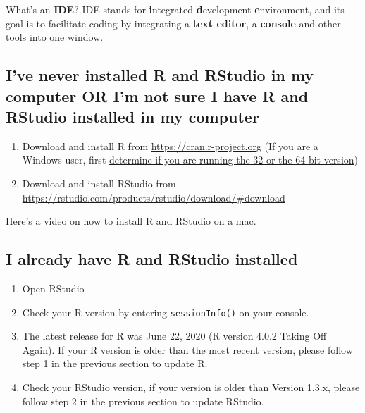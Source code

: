 \documentclass[
]{book}
\providecommand{\tightlist}{%
  \setlength{\itemsep}{0pt}\setlength{\parskip}{0pt}}
\begin{document}
What's an \textbf{IDE}? IDE stands for \textbf{i}ntegrated \textbf{d}evelopment \textbf{e}nvironment, and its goal is to facilitate coding by integrating a \textbf{text editor}, a \textbf{console} and other tools into one window.

\hypertarget{ive-never-installed-r-and-rstudio-in-my-computer-or-im-not-sure-i-have-r-and-rstudio-installed-in-my-computer}{%
\subsection{I've never installed R and RStudio in my computer OR I'm not sure I have R and RStudio installed in my computer}\label{ive-never-installed-r-and-rstudio-in-my-computer-or-im-not-sure-i-have-r-and-rstudio-installed-in-my-computer}}

\begin{enumerate}
\def\labelenumi{\arabic{enumi}.}
\tightlist
\item
  Download and install R from \url{https://cran.r-project.org} (If you are a Windows user, first \href{https://www.computerhope.com/issues/ch001121.htm\#:~:text=Press\%20and\%20hold\%20the\%20Windows,running\%20the\%2064\%2Dbit\%20version.}{determine if you are running the 32 or the 64 bit version})
\item
  Download and install RStudio from \url{https://rstudio.com/products/rstudio/download/\#download}
\end{enumerate}

Here's a \href{https://youtu.be/Iwp8bm7w4fQ}{video on how to install R and RStudio on a mac}.

\hypertarget{i-already-have-r-and-rstudio-installed}{%
\subsection{I already have R and RStudio installed}\label{i-already-have-r-and-rstudio-installed}}

\begin{enumerate}
\def\labelenumi{\arabic{enumi}.}
\tightlist
\item
  Open RStudio
\item
  Check your R version by entering \texttt{sessionInfo()} on your console.
\item
  The latest release for R was June 22, 2020 (R version 4.0.2 Taking Off Again). If your R version is older than the most recent version, please follow step 1 in the previous section to update R.
\item
  Check your RStudio version, if your version is older than Version 1.3.x, please follow step 2 in the previous section to update RStudio.
\end{enumerate}
\end{document}
